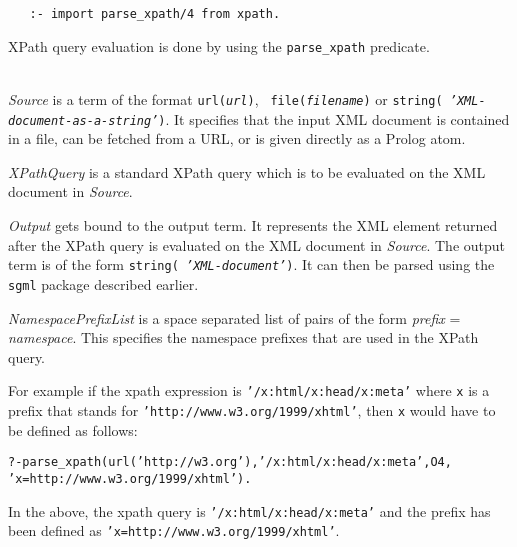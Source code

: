 \begin{verbatim}
   :- import parse_xpath/4 from xpath. 
\end{verbatim}



XPath query evaluation is done by using the {\tt parse\_xpath}  predicate.

\begin{description}
\item[{\bf parse\_xpath}{\bf (}{\it +Source, +XPathQuery, -Output, +NamespacePrefixList}{\bf )}]\mbox{}\\
  {\it Source} is a term of the format {\tt url({\it {url}})}, {\tt
    file({\it {filename}})} or {\tt string({\it
      'XML-document-as-a-string'})}. It specifies that the input XML
  document is contained in a file, can be fetched from a URL, or is given
  directly as a Prolog atom.

  {\it XPathQuery} is a standard XPath query which is to be evaluated on
  the XML document in {\em Source}.
  
  {\it Output} gets bound to the output term. It represents the XML element
  returned after the XPath query is evaluated on the XML document in
  \emph{Source}. The output term is of the form {\tt string({\it
  'XML-document'})}. It can then be parsed using the {\tt sgml} package
  described earlier. 
  
  {\it NamespacePrefixList} is a space separated list of pairs of the form
  \emph{prefix} = \emph{namespace}. This specifies the namespace
  prefixes that are used in the XPath query.


For example if the xpath expression is {\tt '/x:html/x:head/x:meta'}  where
{\tt x} 
is a prefix that stands for
{\tt 'http://www.w3.org/1999/xhtml'}, then {\tt x}  would have to be
defined as follows:

\begin{alltt}	
  ?- parse_xpath(url('http://w3.org'), '/x:html/x:head/x:meta', O4, 
                     'x=http://www.w3.org/1999/xhtml').
\end{alltt}
In the above, the xpath query is {\tt '/x:html/x:head/x:meta'}  and the
prefix has been defined as {\tt 'x=http://www.w3.org/1999/xhtml'}. 
\end{description}



